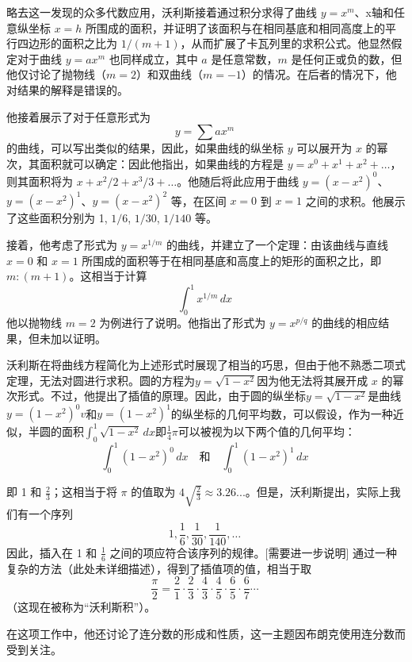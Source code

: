 略去这一发现的众多代数应用，沃利斯接着通过积分求得了曲线 \(y = x^m\)、x轴和任意纵坐标 \(x = h\) 所围成的面积，并证明了该面积与在相同基底和相同高度上的平行四边形的面积之比为 \(1 / (m + 1)\)，从而扩展了卡瓦列里的求积公式。他显然假定对于曲线 \(y = ax^m\) 也同样成立，其中 \(a\) 是任意常数，\(m\) 是任何正或负的数，但他仅讨论了抛物线（\(m = 2\)）和双曲线（\(m = -1\)）的情况。在后者的情况下，他对结果的解释是错误的。

他接着展示了对于任意形式为
\[
y = \sum a x^m~
\]
的曲线，可以写出类似的结果，因此，如果曲线的纵坐标 \(y\) 可以展开为 \(x\) 的幂次，其面积就可以确定：因此他指出，如果曲线的方程是 \(y = x^0 + x^1 + x^2 + \dots\)，则其面积将为 \(x + x^2/2 + x^3/3 + \dots\)。他随后将此应用于曲线 \(y = (x - x^2)^0\)、\(y = (x - x^2)^1\)、\(y = (x - x^2)^2\) 等，在区间 \(x = 0\) 到 \(x = 1\) 之间的求积。他展示了这些面积分别为 1, \(1/6\), \(1/30\), \(1/140\) 等。

接着，他考虑了形式为 \(y = x^{1/m}\) 的曲线，并建立了一个定理：由该曲线与直线 \(x = 0\) 和 \(x = 1\) 所围成的面积等于在相同基底和高度上的矩形的面积之比，即 \(m : (m + 1)\)。这相当于计算
\[
\int_{0}^{1} x^{1/m} \, dx~
\]
他以抛物线 \(m = 2\) 为例进行了说明。他指出了形式为 \(y = x^{p/q}\) 的曲线的相应结果，但未加以证明。

沃利斯在将曲线方程简化为上述形式时展现了相当的巧思，但由于他不熟悉二项式定理，无法对圆进行求积。圆的方程为\(y = \sqrt{1 - x^2}\)因为他无法将其展开成 \(x\) 的幂次形式。不过，他提出了插值的原理。因此，由于圆的纵坐标\(y = \sqrt{1 - x^2}\)是曲线\(y = (1 - x^2)^0v\)和\(y = (1 - x^2)^1\)的纵坐标的几何平均数，可以假设，作为一种近似，半圆的面积\(\int_{0}^{1} \sqrt{1 - x^2} \, dx\)即\(\frac{1}{4} \pi\)可以被视为以下两个值的几何平均：
\[
\int_{0}^{1} (1 - x^2)^0 \, dx \quad \text{和} \quad \int_{0}^{1} (1 - x^2)^1 \, dx~\]

即 1 和 \(\frac{2}{3}\)；这相当于将 \(\pi\) 的值取为 \(4 \sqrt{\frac{2}{3}} \approx 3.26...\)。但是，沃利斯提出，实际上我们有一个序列
\[
1, \frac{1}{6}, \frac{1}{30}, \frac{1}{140}, \dots~
\]
因此，插入在 1 和 \(\frac{1}{6}\) 之间的项应符合该序列的规律。[需要进一步说明] 通过一种复杂的方法（此处未详细描述），得到了插值项的值，相当于取
\[
\frac{\pi}{2} = \frac{2}{1} \cdot \frac{2}{3} \cdot \frac{4}{3} \cdot \frac{4}{5} \cdot \frac{6}{5} \cdot \frac{6}{7} \cdots~
\]
（这现在被称为“沃利斯积”）。

在这项工作中，他还讨论了连分数的形成和性质，这一主题因布朗克使用连分数而受到关注。